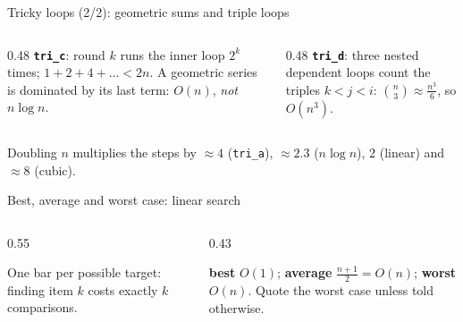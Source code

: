 \documentclass[aspectratio=169,10pt]{beamer}
\newcommand{\pycodes}[2]{}
\newcommand{\pyouts}[2]{}
\begin{document}
\begin{frame}{Tricky loops (2/2): geometric sums and triple loops}
\begin{columns}[T]
\begin{column}{0.48\textwidth}
\vspace{1mm}
{\small
\textbf{\texttt{tri\_c}}: round $k$ runs the inner loop $2^k$ times; $1+2+4+\dots<2n$. A geometric series is dominated by its last term: $O(n)$, \emph{not} $n\log n$.}
\end{column}
\begin{column}{0.48\textwidth}
\vspace{1mm}
{\small
\textbf{\texttt{tri\_d}}: three nested dependent loops count the triples $k<j<i$: $\binom{n}{3}\approx\frac{n^3}{6}$, so $O(n^3)$.}
\end{column}
\end{columns}
\vspace{1mm}
{\footnotesize Doubling $n$ multiplies the steps by $\approx4$ (\texttt{tri\_a}), $\approx2.3$ ($n\log n$), $2$ (linear) and $\approx8$ (cubic).}
\end{frame}

\begin{frame}{Best, average and worst case: linear search}
\begin{columns}[T]
\begin{column}{0.55\textwidth}
\begin{sfig}[0.62]
\end{sfig}
{\scriptsize One bar per possible target: finding item $k$ costs exactly $k$ comparisons.}
\end{column}
\begin{column}{0.43\textwidth}
\pycodes{\fontsize{8}{9.6}}{linsearch}
\vspace{1mm}
\pyouts{\fontsize{6.8}{8.2}}{linear_cases_demo}
\vspace{1mm}
{\small \textbf{best} $O(1)$; \textbf{average} $\frac{n+1}{2}=O(n)$; \textbf{worst} $O(n)$. Quote the worst case unless told otherwise.}
\end{column}
\end{columns}
\end{frame}
\end{document}
